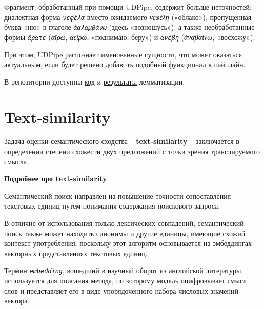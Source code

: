 \documentclass[
  letterpaper,
]{book}
\begin{document}
Фрагмент, обработанный при помощи UDPipe, содержит больше неточностей:
диалектная форма \emph{\texttt{νεφέλα}} вместо ожидаемого \emph{νεφέλη}
(«облако»), пропущенная буква «ню» в глаголе \emph{\texttt{ἀαλαμβάνω}}
(здесь «возношусь»), а также необработанные формы \emph{\texttt{ἄρατε}}
(\emph{αἴρω}, \emph{ἀείρω}, «поднимаю, беру») и \emph{\texttt{ἀνέβη}}
(\emph{ἀναβαίνω}, «восхожу»).

При этом, UDPipe распознает именованные сущности, что может оказаться
актуальным, если будет решено добавить подобный функционал в пайплайн.

В репозитории доступны
\href{https://github.com/Drozhzhinastya/GSPC/tree/main/scripts/lemmatization}{код}
и
\href{https://github.com/Drozhzhinastya/GSPC/tree/main/lemmatization/greek}{результаты}
лемматизации.


\hypertarget{sec-about_txt_similarity}{%
\chapter{Text-similarity}\label{sec-about_txt_similarity}}

Задача оценки семантического сходства -- \textbf{text-similarity} --
заключается в определении степени схожести двух предложений с точки
зрения транслируемого смысла.

\begin{tcolorbox}[enhanced jigsaw, opacityback=0, toprule=.15mm, breakable, arc=.35mm, colback=white, left=2mm, bottomrule=.15mm, leftrule=.75mm, colframe=quarto-callout-note-color-frame, rightrule=.15mm]

\textbf{Подробнее про text-similarity}\vspace{2mm}

Семантический поиск направлен на повышение точности сопоставления
текстовых единиц путем понимания содержания поискового запроса.

В отличие от использования только лексических совпадений, семантический
поиск также может находить синонимы и другие единицы, имеющие схожий
контекст употребления, поскольку этот алгоритм основывается на
эмбеддингах -- векторных представлениях текстовых единиц.

Термин \emph{\texttt{embedding}}, вошедший в научный оборот из
английской литературы, используется для описания метода, по которому
модель оцифровывает смысл слов и представляет его в виде упорядоченного
набора числовых значений -- вектора.

\end{tcolorbox}
\end{document}
